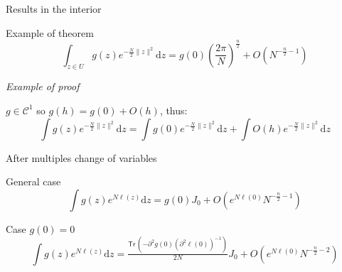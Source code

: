\documentclass{beamer}
\newcommand{\dd}{\mathrm{d}}
\newcommand{\Tr}{\mathsf{Tr}\,}
\newcommand{\class}[1]{{\mathscr{C}^{#1}}}
\begin{document}
\begin{frame}{Results in the interior}
  \begin{block}{Example of theorem}
    \[\int_{z \in U} g(z)e^{-\frac N2\|z\|^2} \dd z = g(0){\left(\frac
          {2\pi}{N}\right)}^{\frac n 2} +
      O\left({N^{-\frac n 2 -1}}\right)\]
  \end{block}

  \pause{}

  \emph{Example of proof}

  $g \in \class 1$ so $g(h) = g(0) + O(h)$, thus:
      \[\int g(z)e^{-\frac N2\|z\|^2} \dd z = \int
        g(0)e^{-\frac N2\|z\|^2} \dd z + \int O(h)e^{-\frac N2\|z\|^2} \dd z \]



\end{frame}

\newcommand{\lol}[1]{#1}

\begin{frame}{After multiples change of variables}

    \begin{block}{General case \onslide<3>{($g \in \class 1$)}}
  \[\int g(z)e^{N\ell(z)} \dd z = g(0) J_0+ O(e^{N\ell(0)} N^{-\frac n 2 -1})\]
\end{block}

  \vfill \pause{}

  \begin{block}{Case $g(0) = 0$ \onslide<3>{($g \in \class 3$)}}
    \[\int g(z)e^{N \ell(z)} \dd z =
      \tfrac{\Tr\left(-\partial^2 g(0) {\left(\partial^2 \ell(0)\right)}^{-1}\right)}{2N}
      J_0
      + O\left(e^{N\ell(0)}{N^{-\frac n 2 -2}}\right)\]
  \end{block}
\end{frame}
\end{document}
